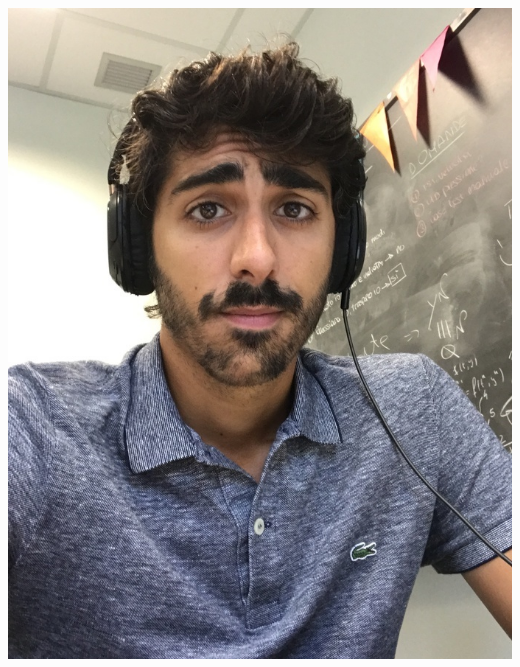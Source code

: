 \documentclass{scrartcl}
\begin{document}
\pagestyle{plain}


\begin{cv}{}\vspace{1.5em} %

\vspace{5.5em}

\begin{marginfigure}%
\includegraphics[width=\marginparwidth]{photo_profile.jpg}
\end{marginfigure}


\end{cv}
\end{document}
